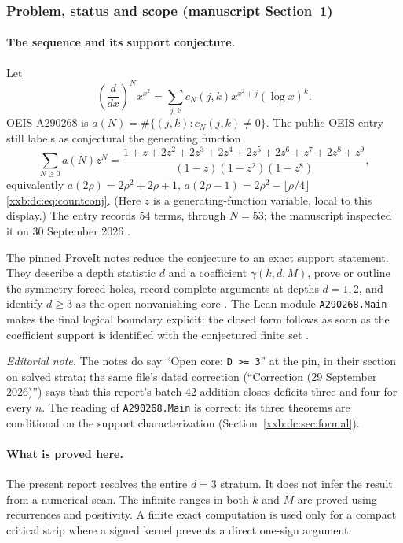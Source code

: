\documentclass[11pt,a4paper]{article}
\numberwithin{equation}{section}
\theoremstyle{definition}
\theoremstyle{remark}
\theoremstyle{plain}
\begin{document}
\subsubsection{Problem, status and scope (manuscript Section~1)}\label{xxb:d3:sec:scope}

\paragraph{The sequence and its support conjecture.}
Let
\[
  \left(\frac{d}{dx}\right)^N x^{x^2}
  =\sum_{j,k}c_N(j,k)x^{x^2+j}(\log x)^k.
\]
OEIS A290268 is $a(N)=\#\{(j,k):c_N(j,k)\neq0\}$.  The public OEIS entry still
labels as conjectural the generating function
\[
 \sum_{N\geq0}a(N)z^N
 =\frac{1+z+2z^2+2z^3+2z^4+2z^5+2z^6+z^7+2z^8+z^9}
 {(1-z)(1-z^2)(1-z^8)},
\]
equivalently $a(2\rho)=2\rho^2+2\rho+1$,
$a(2\rho-1)=2\rho^2-\lfloor \rho/4\rfloor$ \eqref{xxb:dc:eq:countconj}.
(Here $z$ is a generating-function variable, local to this display.)  The
entry records $54$ terms, through $N=53$; the manuscript inspected it on
30 September 2026 \cite{oeis290268}.

The pinned ProveIt notes reduce the conjecture to an exact support statement.
They describe a depth statistic $d$ and a coefficient $\gamma(k,d,M)$, prove
or outline the symmetry-forced holes, record complete arguments at depths
$d=1,2$, and identify $d\geq3$ as the open nonvanishing core
\cite{xxbd3-notes}.  The Lean module \texttt{A290268.Main} makes the final
logical boundary explicit: the closed form follows as soon as the coefficient
support is identified with the conjectured finite set \cite{xxbd3-main}.

\emph{Editorial note.}  The notes do say ``Open core: \texttt{D >= 3}'' at the
pin, in their section on solved strata; the same file's dated correction
(``Correction (29 September 2026)'') says that this report's batch-42 addition
closes deficits three and four for every $n$.  The reading of
\texttt{A290268.Main} is correct: its three theorems are conditional on the
support characterization (Section~\ref{xxb:dc:sec:formal}).

\paragraph{What is proved here.}
The present report resolves the entire $d=3$ stratum.  It does not infer the
result from a numerical scan.  The infinite ranges in both $k$ and $M$ are
proved using recurrences and positivity.  A finite exact computation is used
only for a compact critical strip where a signed kernel prevents a direct
one-sign argument.
\end{document}
